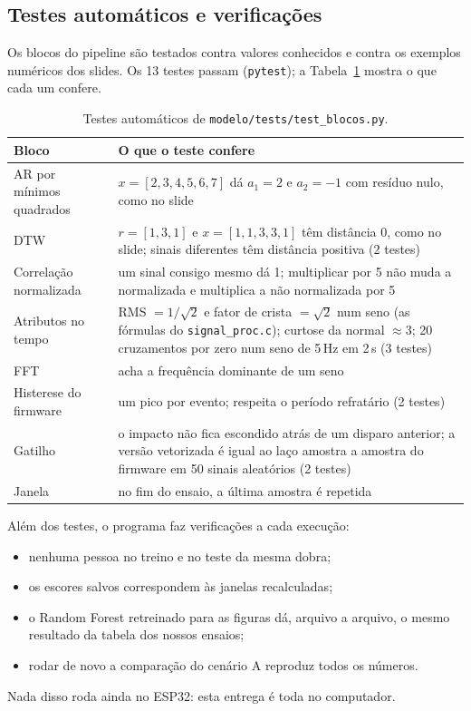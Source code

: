 \documentclass[12pt,a4paper]{article}
\newcommand{\code}[1]{\texttt{#1}}
\begin{document}
\subsection{Testes automáticos e verificações}\label{sec:testes}
Os blocos do pipeline são testados contra valores conhecidos e contra os exemplos
numéricos dos slides. Os 13 testes passam (\code{pytest}); a
Tabela~\ref{tab:testes} mostra o que cada um confere.

\begin{table}[H]
\centering
\caption{Testes automáticos de \code{modelo/tests/test\_blocos.py}.}
\label{tab:testes}
\small
\begin{tabular}{@{}>{\raggedright\arraybackslash}p{5.2cm}>{\raggedright\arraybackslash}p{10.2cm}@{}}
\toprule
Bloco & O que o teste confere \\
\midrule
AR por mínimos quadrados & $x=[2,3,4,5,6,7]$ dá $a_1=2$ e $a_2=-1$ com resíduo nulo, como no slide \\
DTW & $r=[1,3,1]$ e $x=[1,1,3,3,1]$ têm distância 0, como no slide; sinais diferentes têm distância positiva (2 testes) \\
Correlação normalizada & um sinal consigo mesmo dá 1; multiplicar por 5 não muda a normalizada e multiplica a não normalizada por 5 \\
Atributos no tempo & RMS $=1/\sqrt2$ e fator de crista $=\sqrt2$ num seno (as fórmulas do \code{signal\_proc.c}); curtose da normal $\approx3$; 20 cruzamentos por zero num seno de 5\,Hz em 2\,s (3 testes) \\
FFT & acha a frequência dominante de um seno \\
Histerese do firmware & um pico por evento; respeita o período refratário (2 testes) \\
Gatilho & o impacto não fica escondido atrás de um disparo anterior; a versão vetorizada é igual ao laço amostra a amostra do firmware em 50 sinais aleatórios (2 testes) \\
Janela & no fim do ensaio, a última amostra é repetida \\
\bottomrule
\end{tabular}
\end{table}

Além dos testes, o programa faz verificações a cada execução:
\begin{itemize}[leftmargin=1.5em]
\item nenhuma pessoa no treino e no teste da mesma dobra;
\item os escores salvos correspondem às janelas recalculadas;
\item o Random Forest retreinado para as figuras dá, arquivo a arquivo, o mesmo
  resultado da tabela dos nossos ensaios;
\item rodar de novo a comparação do cenário A reproduz todos os números.
\end{itemize}
Nada disso roda ainda no ESP32: esta entrega é toda no computador.
\end{document}
